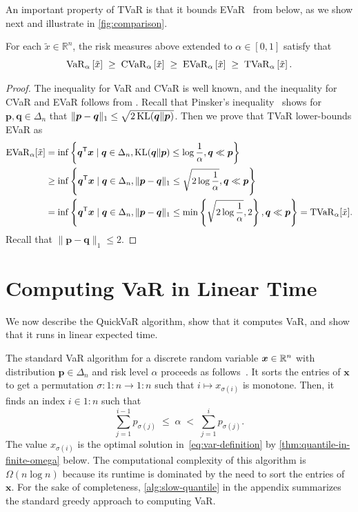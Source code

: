 An important property of TVaR is that it bounds EVaR~\cite{Ahmadi-Javid2012,Hau2023a,Su2025} from below, as we show next and illustrate in \cref{fig:comparison}.
\begin{proposition}
For each $\tilde{x} \in \mathbb{R}^n$, the risk measures above extended to $\alpha\in [0,1]$ satisfy that
\[
  \operatorname{VaR}_{\alpha} \left[\tilde{x}\right]
  \; \ge\; 
  \operatorname{CVaR}_{\alpha} \left[\tilde{x}\right]
  \; \ge\; 
  \operatorname{EVaR}_{\alpha} \left[\tilde{x}\right]
  \; \ge\; 
  \operatorname{TVaR}_{\alpha} \left[\tilde{x}\right].
\]
\end{proposition}
\begin{proof}
 The inequality for VaR and CVaR is well known, and the inequality for CVaR and EVaR follows from \citep[proposition~3.2]{Ahmadi-Javid2012}. Recall that Pinsker's inequality~\citep[theorem~4.19]{boucheron2013concentration} shows for $\bm{p}, \bm{q}\in \Delta_n$ that $\| \bm{p} - \bm{q}\|_1 \le \sqrt{2 \operatorname{KL}(\bm{q} \| \bm{p})}$. Then we prove that TVaR lower-bounds EVaR as
\begin{align*}
\operatorname{EVaR}_{\alpha}[\tilde{x}]
&=
\inf \left\{ \bm{q}^{\mathsf{T}} \bm{x} \mid \bm{q}\in \Delta_n, \operatorname{KL}(\bm{q} \| \bm{p}) \le \log \frac{1}{\alpha }, \bm{q} \ll \bm{p} \right\} \\
&\ge
\inf \left\{ \bm{q}^{\mathsf{T}} \bm{x} \mid \bm{q}\in \Delta_n, \| \bm{p} - \bm{q} \|_1 \le \sqrt{ 2 \log \frac{1}{\alpha }} , \bm{q} \ll \bm{p} \right\} \\
&=\inf \left\{ \bm{q}^{\mathsf{T}} \bm{x} \mid \bm{q}\in \Delta_n, \| \bm{p} - \bm{q} \|_1 \le \min \left\{  \sqrt{ 2 \log \frac{1}{\alpha }}, 2\right\}, \bm{q} \ll \bm{p}\right\}
= \operatorname{TVaR}_{\alpha }[\tilde{x}].
\end{align*}
Recall that $\| \bm{p} - \bm{q}\|_1 \le 2$.
\end{proof}

\section{Computing VaR in Linear Time} \label{sec:var-linear}

We now describe the QuickVaR algorithm, show that it computes VaR, and show that it runs in linear expected time. 

The standard VaR algorithm for a discrete random variable $\bm{x}\in \mathbb{R}^n$ with distribution $\bm{p}\in \Delta_n$ and risk level $\alpha$ proceeds as follows~\citep[listing~6.25]{privault2026notes}. It sorts the entries of $\bm{x}$ to get a permutation $\sigma \colon 1{:}n \to 1{:}n$ such that $i \mapsto x_{\sigma(i)}$ is monotone. Then, it finds an index $i \in 1{:}n$ such that
\[
  \sum_{j = 1}^{i-1} p_{\sigma(j)}
  \; \le \;
  \alpha
  \; <\;
  \sum_{j = 1}^i p_{\sigma(j)}.
\]
The value $x_{\sigma(i)}$ is the optimal solution in~\eqref{eq:var-definition} by \cref{thm:quantile-in-finite-omega} below. The computational complexity of this algorithm is $\Omega(n \log  n)$ because its runtime is dominated by the need to sort the entries of $\bm{x}$. For the sake of completeness, \cref{alg:slow-quantile} in the appendix summarizes the standard greedy approach to computing VaR. 

